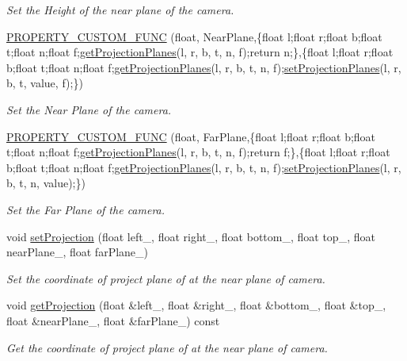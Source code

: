 \begin{DoxyCompactItemize}
\begin{DoxyCompactList}\small\item\em Set the Height of the near plane of the camera. \end{DoxyCompactList}\item 
\hyperlink{class_orthographic_camera_component_aa0b09720d63eac8b4b314eb5755212ff}{P\+R\+O\+P\+E\+R\+T\+Y\+\_\+\+C\+U\+S\+T\+O\+M\+\_\+\+F\+U\+NC} (float, Near\+Plane,\{float l;float r;float b;float t;float n;float f;\hyperlink{class_magnum_1_1_camera_component_af5d94dcadd4011e3a0dad972c8eadd9b}{get\+Projection\+Planes}(l, r, b, t, n, f);return n;\},\{float l;float r;float b;float t;float n;float f;\hyperlink{class_magnum_1_1_camera_component_af5d94dcadd4011e3a0dad972c8eadd9b}{get\+Projection\+Planes}(l, r, b, t, n, f);\hyperlink{class_magnum_1_1_camera_component_ab50fcc345c5beb14317b4bb74f6c2b2e}{set\+Projection\+Planes}(l, r, b, t, value, f);\})
\begin{DoxyCompactList}\small\item\em Set the Near Plane of the camera. \end{DoxyCompactList}\item 
\hyperlink{class_orthographic_camera_component_a7a41645a280fa8019bd3f1245a3bbf12}{P\+R\+O\+P\+E\+R\+T\+Y\+\_\+\+C\+U\+S\+T\+O\+M\+\_\+\+F\+U\+NC} (float, Far\+Plane,\{float l;float r;float b;float t;float n;float f;\hyperlink{class_magnum_1_1_camera_component_af5d94dcadd4011e3a0dad972c8eadd9b}{get\+Projection\+Planes}(l, r, b, t, n, f);return f;\},\{float l;float r;float b;float t;float n;float f;\hyperlink{class_magnum_1_1_camera_component_af5d94dcadd4011e3a0dad972c8eadd9b}{get\+Projection\+Planes}(l, r, b, t, n, f);\hyperlink{class_magnum_1_1_camera_component_ab50fcc345c5beb14317b4bb74f6c2b2e}{set\+Projection\+Planes}(l, r, b, t, n, value);\})
\begin{DoxyCompactList}\small\item\em Set the Far Plane of the camera. \end{DoxyCompactList}\item 
void \hyperlink{class_orthographic_camera_component_a8e1270031c486ce7c92145b28c74c9fe}{set\+Projection} (float left\+\_\+, float right\+\_\+, float bottom\+\_\+, float top\+\_\+, float near\+Plane\+\_\+, float far\+Plane\+\_\+)
\begin{DoxyCompactList}\small\item\em Set the coordinate of project plane of at the near plane of camera. \end{DoxyCompactList}\item 
void \hyperlink{class_orthographic_camera_component_a0b65352cd50f14c0b801bb5ac427c1fd}{get\+Projection} (float \&left\+\_\+, float \&right\+\_\+, float \&bottom\+\_\+, float \&top\+\_\+, float \&near\+Plane\+\_\+, float \&far\+Plane\+\_\+) const 
\begin{DoxyCompactList}\small\item\em Get the coordinate of project plane of at the near plane of camera. \end{DoxyCompactList}\end{DoxyCompactItemize}
